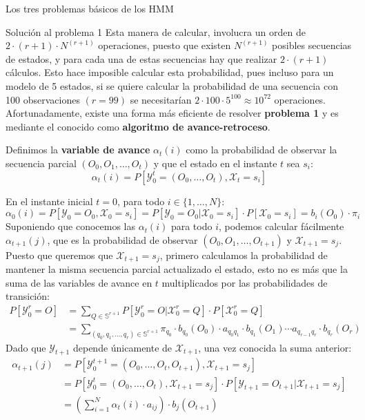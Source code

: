 \begin{section}{Los tres problemas básicos de los HMM}
\begin{subsection}{Solución al problema 1}
Esta manera de calcular, involucra un orden de $2\cdot(r+1)\cdot N^{(r+1)}$ operaciones, puesto que existen $N^{(r+1)}$ posibles secuencias de estados, y para cada una de estas secuencias hay que realizar $2\cdot(r+1)$ cálculos. Esto hace imposible calcular esta probabilidad, pues incluso para un modelo de 5 estados, si se quiere calcular la probabilidad de una secuencia con 100 observaciones $(r=99)$ se necesitarían $2\cdot100\cdot5^{100}\approx10^{72}$ operaciones. Afortunadamente, existe una forma más eficiente de resolver \textbf{problema 1} y es mediante el conocido como \textbf{algoritmo de avance-retroceso}. 

\begin{definition}
Definimos la \textbf{variable de avance} $\alpha_t(i)$ como la probabilidad de observar la secuencia parcial $(O_0,O_1,\dots,O_t)$ y que el estado en el instante $t$ sea $s_i$:
\[ \alpha_t(i)=P[\mathcal{Y}_0^t=(O_0,\dots,O_t), \mathcal{X}_t=s_i]\]
\end{definition}
En el instante inicial $t=0$, para todo $i\in\{1,\dots,N\}$:
\[ \alpha_0(i)=P[\mathcal{Y}_0=O_0, \mathcal{X}_0=s_i]=P[\mathcal{Y}_0=O_0|\mathcal{X}_0=s_i]\cdot P[\mathcal{X}_0=s_i]=b_i(O_0)\cdot\pi_i\]
Suponiendo que conocemos las $\alpha_{t}(i)$ para todo $i$, podemos calcular fácilmente $\alpha_{t+1}(j)$, que es la probabilidad de observar $(O_0,O_1,\dots,O_{t+1})$ y $\mathcal{X}_{t+1}=s_j$. Puesto que queremos que $\mathcal{X}_{t+1}=s_j$, primero calculamos la probabilidad de mantener la misma secuencia parcial actualizado el estado, esto no es más que la suma de las variables de avance en $t$ multiplicados por las probabilidades de transición:
\[
\begin{aligned}
    P[\mathcal{Y}_0^r=O]&=\sum_{Q\in\mathbb{S}^{r+1}}P[\mathcal{Y}_0^r=O|\mathcal{X}_0^r=Q]\cdot P[\mathcal{X}_0^r=Q]\\
    &=\sum_{(q_0 , q_1 , \dots , q_r)\in\mathbb{S}^{r+1}}\pi_{q_0}\cdot b_{q_0}(O_0)\cdot a_{q_0q_1}\cdot b_{q_1}(O_1)\cdots a_{q_{r-1}q_r}\cdot b_{q_r}(O_r)
\end{aligned}    
\]
Dado que $\mathcal{Y}_{t+1}$ depende únicamente de $\mathcal{X}_{t+1}$, una vez conocida la suma anterior:
\[
\begin{aligned}
    \alpha_{t+1}(j)&=P[\mathcal{Y}_0^{t+1}=(O_0,\dots,O_t,O_{t+1}), \mathcal{X}_{t+1}=s_j]\\
    &=P[\mathcal{Y}_0^t=(O_0,\dots,O_t), \mathcal{X}_{t+1}=s_j]\cdot P[\mathcal{Y}_{t+1}=O_{t+1}|\mathcal{X}_{t+1}=s_j]\\
    &=\left(\sum_{i=1}^N\alpha_{t}(i)\cdot a_{ij}\right)\cdot b_j(O_{t+1})

\end{aligned}\]
\end{subsection}
\end{section}
